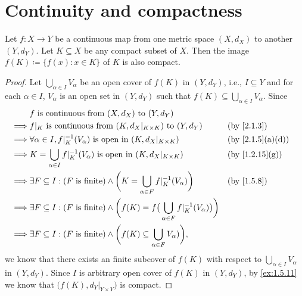 \section{Continuity and compactness}\label{sec:2.3}

\begin{thm}\label{2.3.1}
  Let \(f : X \to Y\) be a continuous map from one metric space \((X, d_X)\) to another \((Y, d_Y)\).
  Let \(K \subseteq X\) be any compact subset of \(X\).
  Then the image \(f(K) \coloneqq \{f(x) : x \in K\}\) of \(K\) is also compact.
\end{thm}

\begin{proof}
  Let \(\bigcup_{\alpha \in I} V_\alpha\) be an open cover of \(f(K)\) in \((Y, d_Y)\), i.e., \(I \subseteq Y\) and for each \(\alpha \in I\), \(V_{\alpha}\) is an open set in \((Y, d_Y)\) such that \(f(K) \subseteq \bigcup_{\alpha \in I} V_\alpha\).
  Since
  \begin{align*}
             & f \text{ is continuous from } (X, d_X) \text{ to } (Y, d_Y)                                                                                                      \\
    \implies & f|_K \text{ is continuous from } (K, d_X|_{K \times K}) \text{ to } (Y, d_Y)                                                 &  & \by{2.1.3}                     \\
    \implies & \forall \alpha \in I, f|_K^{-1}(V_\alpha) \text{ is open in } (K, d_X|_{K \times K})                                         &  & \text{(by \cref{2.1.5}(a)(d))} \\
    \implies & K = \bigcup_{\alpha \in I} f|_K^{-1}(V_\alpha) \text{ is open in } (K, d_X|_{K \times K})                                    &  & \text{(by \cref{1.2.15}(g))}   \\
    \implies & \exists F \subseteq I : (F \text{ is finite}) \land \bigg(K = \bigcup_{\alpha \in F} f|_K^{-1}(V_\alpha)\bigg)               &  & \by{1.5.8}                     \\
    \implies & \exists F \subseteq I : (F \text{ is finite}) \land \bigg(f(K) = f\big(\bigcup_{\alpha \in F} f|_K^{-1}(V_\alpha)\big)\bigg)                                     \\
    \implies & \exists F \subseteq I : (F \text{ is finite}) \land \bigg(f(K) \subseteq \bigcup_{\alpha \in F} V_\alpha)\bigg),
  \end{align*}
  we know that there exists an finite subcover of \(f(K)\) with respect to \(\bigcup_{\alpha \in I} V_\alpha\) in \((Y, d_Y)\).
  Since \(I\) is arbitrary open cover of \(f(K)\) in \((Y, d_Y)\), by \cref{ex:1.5.11} we know that \(\big(f(K), d_Y|_{Y \times Y}\big)\) is compact.
\end{proof}

